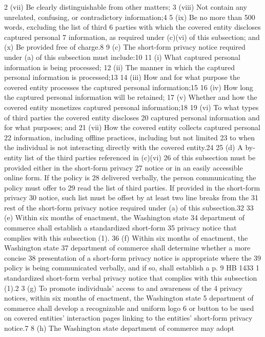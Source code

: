 2 (vii) Be clearly distinguishable from other matters;
3 (viii) Not contain any unrelated, confusing, or contradictory
information;4
5 (ix) Be no more than 500 words, excluding the list of third
6 parties with which the covered entity discloses captured personal
7 information, as required under (c)(vi) of this subsection; and
(x) Be provided free of charge.8
9 (c) The short-form privacy notice required under (a) of this
subsection must include:10
11 (i) What captured personal information is being processed;
12 (ii) The manner in which the captured personal information is
processed;13
14 (iii) How and for what purpose the covered entity processes the
captured personal information;15
16 (iv) How long the captured personal information will be retained;
17 (v) Whether and how the covered entity monetizes captured
personal information;18
19 (vi) To what types of third parties the covered entity discloses
20 captured personal information and for what purposes; and
21 (vii) How the covered entity collects captured personal
22 information, including offline practices, including but not limited
23 to when the individual is not interacting directly with the covered
entity.24
25 (d) A by-entity list of the third parties referenced in (c)(vi)
26 of this subsection must be provided either in the short-form privacy
27 notice or in an easily accessible online form. If the policy is
28 delivered verbally, the person communicating the policy must offer to
29 read the list of third parties. If provided in the short-form privacy
30 notice, such list must be offset by at least two line breaks from the
31 rest of the short-form privacy notice required under (a) of this
subsection.32
33 (e) Within six months of enactment, the Washington state
34 department of commerce shall establish a standardized short-form
35 privacy notice that complies with this subsection (1).
36 (f) Within six months of enactment, the Washington state
37 department of commerce shall determine whether a more concise
38 presentation of a short-form privacy notice is appropriate where the
39 policy is being communicated verbally, and if so, shall establish a
p. 9 HB 1433
1 standardized short-form verbal privacy notice that complies with this
subsection (1).2
3 (g) To promote individuals' access to and awareness of the
4 privacy notices, within six months of enactment, the Washington state
5 department of commerce shall develop a recognizable and uniform logo
6 or button to be used on covered entities' interaction pages linking
to the entities' short-form privacy notice.7
8 (h) The Washington state department of commerce may adopt
